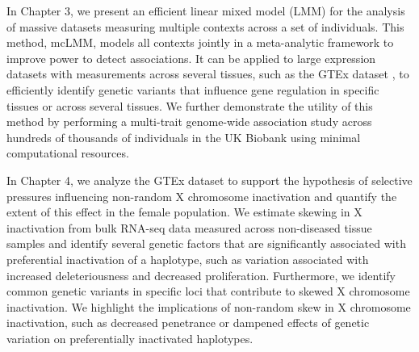 In Chapter 3, we present an efficient linear mixed model (LMM) for the analysis of massive datasets measuring multiple contexts across a set of individuals. This method, mcLMM, models all contexts jointly in a meta-analytic framework to improve power to detect associations. It can be applied to large expression datasets with measurements across several tissues, such as the GTEx dataset \cite{GTEx_Consortium2020-xx}, to efficiently identify genetic variants that influence gene regulation in specific tissues or across several tissues. We further demonstrate the utility of this method by performing a multi-trait genome-wide association study across hundreds of thousands of individuals in the UK Biobank \cite{Bycroft2018} using minimal computational resources.

In Chapter 4, we analyze the GTEx dataset \cite{GTEx_Consortium2020-xx} to support the hypothesis of selective pressures influencing non-random X chromosome inactivation \cite{Migeon1998-gc} and quantify the extent of this effect in the female population. We estimate skewing in X inactivation from bulk RNA-seq data measured across non-diseased tissue samples and identify several genetic factors that are significantly associated with preferential inactivation of a haplotype, such as variation associated with increased deleteriousness and decreased proliferation. Furthermore, we identify common genetic variants in specific loci that contribute to skewed X chromosome inactivation. We highlight the implications of non-random skew in X chromosome inactivation, such as decreased penetrance or dampened effects of genetic variation on preferentially inactivated haplotypes.